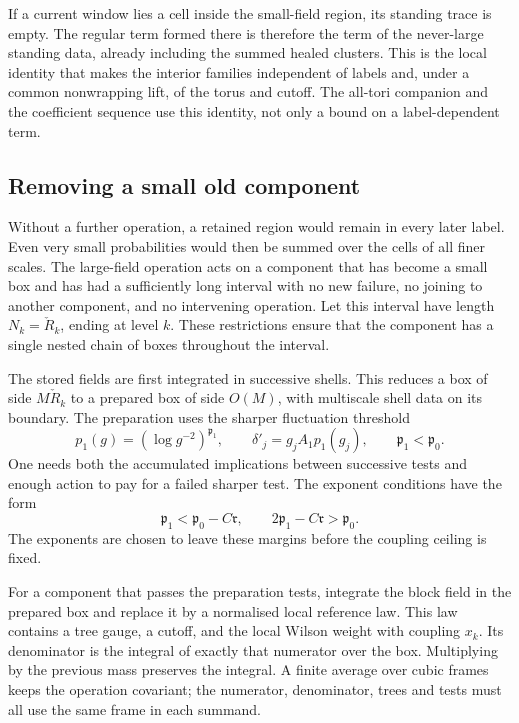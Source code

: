 \documentclass[11pt,letterpaper,reqno]{amsart}
\theoremstyle{definition}
\theoremstyle{remark}
\begin{document}
If a current window lies a
cell inside the small-field
region, its standing trace
is empty. The regular term
formed there is therefore
the term of the never-large
standing data, already including
the summed healed clusters.
This is the local identity
that makes the interior
families independent of
labels and, under a common
nonwrapping lift, of the
torus and cutoff. The
all-tori companion and the
coefficient sequence use
this identity, not only a
bound on a label-dependent
term.

\subsection{Removing a small old component}

Without a further operation, a retained region would remain in every
later label. Even very small probabilities would then be summed over
the cells of all finer scales. The large-field operation acts on a
component that has become a small box and has had a sufficiently long
interval with no new failure, no joining to another component, and
no intervening operation. Let this interval have length
$N_k=\check R_k$, ending at level $k$. These restrictions ensure that
the component has a single nested chain of boxes throughout the
interval.

The stored fields are first integrated in successive shells. This
reduces a box of side $M\check R_k$ to a prepared box of side $O(M)$,
with multiscale shell data on its boundary. The preparation uses the
sharper fluctuation threshold
\[
 p_1(g)=(\log g^{-2})^{\mathfrak p_1},\qquad
 \delta'_j=g_jA_1p_1(g_j),
 \qquad \mathfrak p_1<\mathfrak p_0.
\]
One needs both the accumulated implications between successive tests
and enough action to pay for a failed sharper test. The exponent
conditions have the form
\begin{equation}\label{eq:threshold-exponents}
 \mathfrak p_1<\mathfrak p_0-C\mathfrak r,
 \qquad 2\mathfrak p_1-C\mathfrak r>\mathfrak p_0.
\end{equation}
The exponents are chosen to leave these margins before the coupling
ceiling is fixed.

For a component that passes the preparation tests, integrate the block
field in the prepared box and replace it by a normalised local
reference law. This law contains a tree gauge, a cutoff, and the local
Wilson weight with coupling $x_k$. Its denominator is the integral
of exactly that numerator over the box. Multiplying by the previous
mass preserves the integral. A finite average over cubic frames keeps
the operation covariant; the numerator, denominator, trees and tests
must all use the same frame in each summand.
\end{document}

